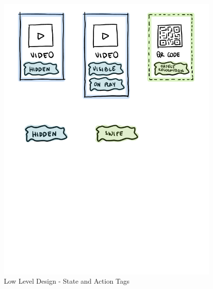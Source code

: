 \begin{figure}[h]
    \centering
    \includegraphics[width=\textwidth]{Figures/Editor/wireframes/SaSTags.png}
    \caption{Low Level Design - State and Action Tags}
    \label{fig:sasTags}
\end{figure}

